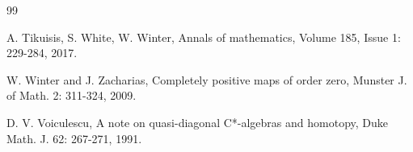 \documentclass{article}%
\begin{document}
\begin{thebibliography}{99}


 A. Tikuisis, S. White, W. Winter, Annals of mathematics,   Volume 185, Issue 1: 229-284, 2017.

W. Winter and J. Zacharias, Completely positive maps of order zero, Munster J. of Math. 2: 311-324, 2009.



D. V. Voiculescu, A note on quasi-diagonal C*-algebras and homotopy, Duke Math. J. 62:  267-271, 1991.

\end{thebibliography}
\end{document}
